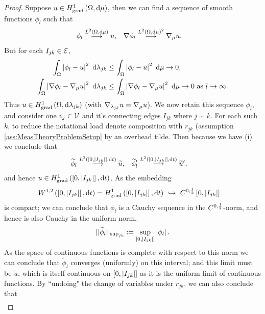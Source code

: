 \begin{proof}
	Suppose $u\in H^1_\mathrm{grad}\left( \Omega, \mathrm{d}\mu \right)$, then we can find a sequence of smooth functions $\phi_l$ such that
	\begin{align*}
		\phi_l \overset{L^{2}\left( \Omega,\mathrm{d}\mu \right)}{\longrightarrow} u, 
		&\quad \nabla\phi_l \overset{L^{2}\left( \Omega,\mathrm{d}\mu \right)^2}{\longrightarrow} \nabla_\mu u.
	\end{align*}
	But for each $I_{jk}\in \mathcal{E}$,
	\begin{align*}
		\int_{\Omega}\left\lvert  \phi_l - u  \right\rvert^2 \ \mathrm{d}\lambda_{jk}
		&\leq \int_{\Omega}\left\lvert  \phi_l - u  \right\rvert^2 \ \mathrm{d}\mu \rightarrow 0, \\
		\int_{\Omega}\left\lvert  \nabla\phi_l - \nabla_\mu u  \right\rvert^2 \ \mathrm{d}\lambda_{jk}
		&\leq \int_{\Omega}\left\lvert  \nabla\phi_l - \nabla_\mu u  \right\rvert^2 \ \mathrm{d}\mu \rightarrow 0 \ \text{as} \ l \rightarrow\infty.
	\end{align*}
	Thus $u\in H^1_\mathrm{grad}\left( \Omega, \mathrm{d}\lambda_{jk} \right)$ (with $\nabla_{\lambda_{jk}}u = \nabla_\mu u$).
	We now retain this sequence $\phi_l$, and consider one $v_j\in \mathcal{V}$ and it's connecting edges $I_{jk}$ where $j\sim k$.
	For each such $k$, to reduce the notational load denote composition with $r_{jk}$ (assumption \ref{ass:MeasTheoryProblemSetup} by an overhead tilde.
	Then because we have (i) we conclude that 
	\begin{align*}
		\widetilde{\phi}_l \overset{L^{2}\left( \left[ 0,\left\lvert I_{jk} \right\rvert \right],\mathrm{d}t \right)}{\longrightarrow} \widetilde{u}, 
		&\quad \widetilde{\phi}'_l \overset{L^{2}\left( \left[ 0,\left\lvert I_{jk} \right\rvert \right],\mathrm{d}t \right)}{\longrightarrow} \widetilde{u}',
	\end{align*}
	and hence $u\in H^1_\mathrm{grad}\left( \left[ 0,\left\lvert I_{jk} \right\rvert \right], \mathrm{d}t \right)$.
	As the embedding 
	\begin{align*}
		W^{1,2}\bracs{\interval{I_{jk}}, \md t} = \gradSob{\interval{I_{jk}}}{t} \ &\hookrightarrow \ C^{0,\recip{2}}\interval{I_{jk}}
	\end{align*}
	is compact; we can conclude that $\phi_l$ is a Cauchy sequence in the $C^{0,\frac{1}{2}}$-norm, and hence is also Cauchy in the uniform norm,
	\begin{align*}
		\lvert\lvert \widetilde{\phi}_l \rvert\rvert_{\mathrm{sup}_{jk}} := \sup_{\left[ 0,\left\lvert I_{jk} \right\rvert \right]}\left\lvert \phi_l \right\rvert.
	\end{align*}
	As the space of continuous functions is complete with respect to this norm we can conclude that $\widetilde{\phi}_l$ converges (uniformly) on this interval; and this limit must be $\widetilde{u}$, which is itself continuous on $\left[ 0,\left\lvert I_{jk} \right\rvert \right]$ as it is the uniform limit of continuous functions.
	By ``undoing" the change of variables under $r_{jk}$, we can also conclude that
	\begin{align*}

\end{align*}
\end{proof}
